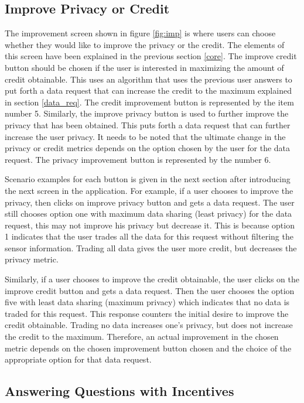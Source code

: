 \subsection{Improve Privacy or Credit}

The improvement screen shown in figure \ref{fig:imp} is where users can choose whether they would like to improve the privacy or the credit. The elements of this screen have been explained in the previous section \ref{core}.
The improve credit button
should be chosen if the user is interested in maximizing the amount of credit obtainable. This uses an algorithm that uses the previous user answers to
put forth a data request that can increase the credit to the maximum explained in section \ref{data_req}. The credit improvement button is represented by the item number 5. Similarly, the improve privacy button is used to further improve the privacy that has been obtained. This puts forth a data request that can further increase the user privacy. It needs to be noted that the ultimate change in the privacy or credit metrics depends on the option chosen by the user for the data request. The privacy improvement button is represented by the number 6.

Scenario examples for each button is given in the next section after introducing the next screen in the application. For example, if a user chooses to improve the privacy, then clicks on improve privacy button and gets a data request. The user still chooses option one with maximum data sharing (least privacy) for the data request, this may not improve his privacy but decrease it. This is because option 1 indicates that the user trades all the data for this request without filtering the sensor information. Trading all data gives the user more credit, but decreases the privacy metric.

Similarly, if a user chooses to improve the credit obtainable, the user clicks on the improve credit button and gets a data request. Then the user chooses the option five with least data sharing (maximum privacy) which indicates that no data is traded for this request. This response counters the initial desire to improve the credit obtainable. Trading no data increases one's privacy, but does not increase the credit to the maximum. Therefore, an actual improvement in the chosen metric depends on the chosen improvement button chosen and the choice of the appropriate option for that data request.

\subsection{Answering Questions with Incentives}

